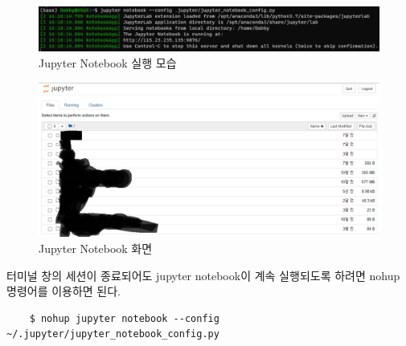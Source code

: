\begin{figure}[H]
	\begin{center}
        \includegraphics[width=0.6\linewidth]{jupyter_notebook_running}
        \caption{Jupyter Notebook 실행 모습}
    \end{center}
\end{figure}

\begin{figure}[H]
	\begin{center}
        \includegraphics[width=0.8\linewidth]{jupyter_notebook_display}
        \caption{Jupyter Notebook 화면}
    \end{center}
\end{figure}

터미널 창의 세션이 종료되어도 jupyter notebook이 계속 실행되도록 하려면 nohup 명령어를 이용하면 된다.
\begin{lstlisting}
    $ nohup jupyter notebook --config ~/.jupyter/jupyter_notebook_config.py
\end{lstlisting}